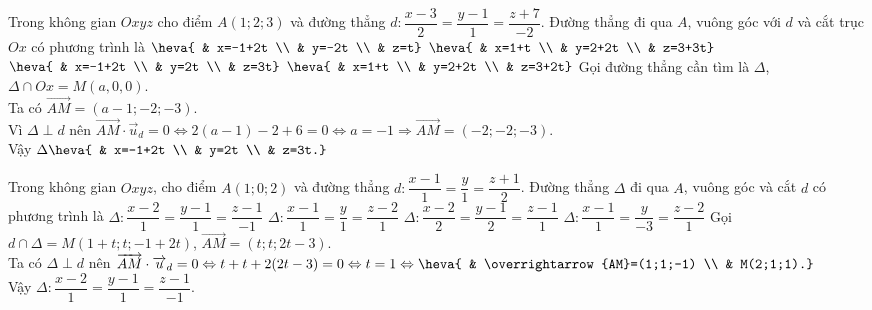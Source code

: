 \begin{ex}%
	Trong không gian $Oxyz$ cho điểm $A(1;2;3)$ và đường thẳng $d\colon \dfrac{x-3}{2}=\dfrac{y-1}{1}=\dfrac{z+7}{-2}$. Đường thẳng đi qua $A$, vuông góc với $d$ và cắt trục $Ox$ có phương trình là
	\choice
	{$\heva{ & x=-1+2t \\ & y=-2t \\ & z=t}$}
	{$\heva{ & x=1+t \\ & y=2+2t \\ & z=3+3t}$}
	{\True $\heva{ & x=-1+2t \\ & y=2t \\ & z=3t}$}
	{$\heva{ & x=1+t \\ & y=2+2t \\ & z=3+2t}$}
	\loigiai
	{
		Gọi đường thẳng cần tìm là $\Delta$, $\Delta \cap Ox=M(a,0,0)$.\\
		Ta có $\overrightarrow{AM}=(a-1;-2;-3)$.\\
		Vì $\Delta\perp d$ nên $\overrightarrow{AM}\cdot\overrightarrow{u}_{d}=0\Leftrightarrow 2(a-1)-2+6=0\Leftrightarrow a=-1\Rightarrow \overrightarrow{AM}=(-2;-2;-3)$.\\
		Vậy $\Delta \heva{ & x=-1+2t \\ & y=2t \\ & z=3t.}$
	}
\end{ex}

\begin{ex}%
	Trong không gian $Oxyz$, cho điểm  $A(1;0;2)$ và đường thẳng $d\colon \dfrac{x-1}{1}=\dfrac{y}{1}=\dfrac{z+1}{2}$. Đường thẳng $\Delta$ đi qua $A$, vuông góc và cắt $d$ có phương trình là
	\choice
	{\True $\Delta\colon \dfrac{x-2}{1}=\dfrac{y-1}{1}=\dfrac{z-1}{-1}$}
	{$\Delta\colon \dfrac{x-1}{1}=\dfrac{y}{1}=\dfrac{z-2}{1}$}
	{$\Delta\colon \dfrac{x-2}{2}=\dfrac{y-1}{2}=\dfrac{z-1}{1}$}
	{$\Delta\colon \dfrac{x-1}{1}=\dfrac{y}{-3}=\dfrac{z-2}{1}$}
	\loigiai
	{
		Gọi $d\cap\Delta=M(1+t;t;-1+2t)$, $\overrightarrow{AM}=(t;t;2t-3)$.\\
		Ta có $\Delta\perp d$ nên $\overrightarrow{AM}\cdot\overrightarrow{u}_{d}=0 \Leftrightarrow t+t+2(2t-3)=0 \Leftrightarrow t=1 \Leftrightarrow \heva{ & \overrightarrow{AM}=(1;1;-1) \\ & M(2;1;1).}$\\
		Vậy $\Delta\colon \dfrac{x-2}{1}=\dfrac{y-1}{1}=\dfrac{z-1}{-1}$.
	}
\end{ex}

